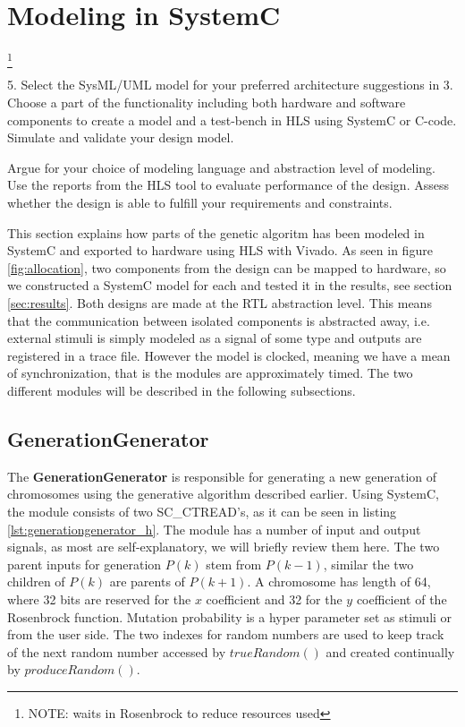 \section{Modeling in SystemC}
\footnote{\color{red}NOTE: waits in Rosenbrock to reduce resources used}

\begin{framed}
5. Select the SysML/UML model for your preferred architecture suggestions in 3. Choose a part of the functionality including both hardware and software components to create a model and a test-bench in HLS using SystemC or C-code. Simulate and validate your design model.

Argue for your choice of modeling language and abstraction level of modeling. Use the reports from the HLS tool to evaluate performance of the design. Assess whether the design is able to fulfill your requirements and constraints.
\end{framed}

This section explains how parts of the genetic algoritm has been modeled in SystemC and exported to hardware using HLS with Vivado. As seen in figure \ref{fig:allocation}, two components from the design can be mapped to hardware, so we constructed a SystemC model for each and tested it in the results, see section \ref{sec:results}. Both designs are made at the RTL abstraction level. This means that the communication between isolated components is abstracted away, i.e. external stimuli is simply modeled as a signal of some type and outputs are registered in a trace file. However the model is clocked, meaning we have a mean of synchronization, that is the modules are approximately timed. The two different modules will be described in the following subsections.

\subsection{GenerationGenerator}
The \textbf{GenerationGenerator} is responsible for generating a new generation of chromosomes using the generative algorithm described earlier. Using SystemC, the module consists of two SC\_CTREAD's, as it can be seen in listing \ref{lst:generationgenerator_h}. The module has a number of input and output signals, as most are self-explanatory, we will briefly review them here. The two parent inputs for generation $P(k)$ stem from $P(k-1)$, similar the two children of $P(k)$ are parents of $P(k+1)$. A chromosome has length of 64, where 32 bits are reserved for the $x$ coefficient and 32 for the $y$ coefficient of the Rosenbrock function. Mutation probability is a hyper parameter set as stimuli or from the user side. The two indexes for random numbers are used to keep track of the next random number accessed by $trueRandom()$ and created continually by $produceRandom()$.  

